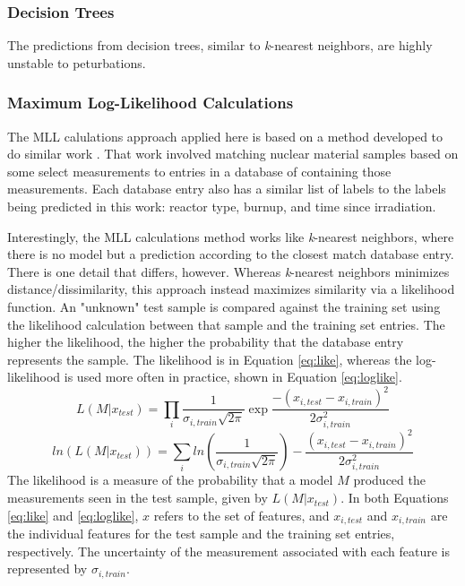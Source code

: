\subsubsection{Decision Trees}

The predictions from decision trees, similar to \textit{k}-nearest neighbors,
are highly unstable to peturbations. 

\cite{elements_stats}

\subsubsection{Maximum Log-Likelihood Calculations}

The \gls{MLL} calulations approach applied here is based on a method developed
to do similar work \cite{mll_method, mll_validate, mll_sensitivity}.  That work
involved matching nuclear material samples based on some select measurements to
entries in a database of containing those measurements.
Each database entry also has a similar list of labels to the labels being
predicted in this work: reactor type, burnup, and time since irradiation.

Interestingly, the \gls{MLL} calculations method works like \textit{k}-nearest
neighbors, where there is no model but a prediction according to the closest
match database entry.  There is one detail that differs, however. Whereas
\textit{k}-nearest neighbors minimizes distance/dissimilarity, this approach
instead maximizes similarity via a likelihood function. An "unknown" test
sample is compared against the training set using the likelihood calculation
between that sample and the training set entries.  The higher the likelihood,
the higher the probability that the database entry represents the sample. The
likelihood is in Equation \ref{eq:like}, whereas the log-likelihood is used
more often in practice, shown in Equation \ref{eq:loglike}.
\begin{equation}
  L(M|x_{test}) = \prod_i \frac{1}{\sigma_{i,train} \sqrt{2\pi}} \exp{\frac{-(x_{i,test} - x_{i,train})^2}{2 \sigma_{i,train}^2}}
  \label{eq:like}
\end{equation}
\begin{equation}
  ln(L(M|x_{test})) = \sum_i ln(\frac{1}{\sigma_{i,train} \sqrt{2\pi}}) - \frac{(x_{i,test} - x_{i,train})^2}{2 \sigma_{i,train}^2}
  \label{eq:loglike}
\end{equation}
The likelihood is a measure of the probability that a model $M$ produced the
measurements seen in the test sample, given by $L(M|x_{test})$.  In both
Equations \ref{eq:like} and \ref{eq:loglike}, $x$ refers to the set of
features, and $x_{i, test}$ and $x_{i,train}$ are the individual features for the
test sample and the training set entries, respectively. The uncertainty of the
measurement associated with each feature is represented by $\sigma_{i,train}$.


